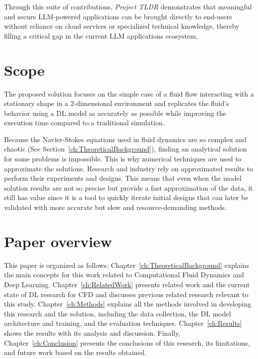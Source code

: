 Through this suite of contributions, \textit{Project TLDR} demonstrates that meaningful and secure LLM-powered applications can be brought directly to end-users without reliance on cloud services or specialized technical knowledge, thereby filling a critical gap in the current LLM applications ecosystem.


\section{Scope}
\label{sec:Scope}
The proposed solution focuses on the simple case of a fluid flow interacting with a stationary shape in a 2-dimensional environment and replicates the fluid's behavior using a DL model as accurately as possible while improving the execution time compared to a traditional simulation. 

Because the Navier-Stokes equations used in fluid dynamics are so complex and chaotic (See Section~\ref{ch:TheoreticalBackground}), finding an analytical solution for some problems is impossible. This is why numerical techniques are used to approximate the solutions. Research and industry rely on approximated results to perform their experiments and designs. This means that even when the model solution results are not so precise but provide a fast approximation of the data, it still has value since it is a tool to quickly iterate initial designs that can later be validated with more accurate but slow and resource-demanding methods.

\section{Paper overview}
\label{sec:PaperOverview}
This paper is organized as follows: Chapter~\ref{ch:TheoreticalBackground} explains the main concepts for this work related to Computational Fluid Dynamics and Deep Learning. Chapter~\ref{ch:RelatedWork} presents related work and the current state of DL research for CFD and discusses previous related research relevant to this study. Chapter~\ref{ch:Methods} explains all the methods involved in developing this research and the solution, including the data collection, the DL model architecture and training, and the evaluation techniques. Chapter~\ref{ch:Results} shows the results with its analysis and discussion. Finally, Chapter~\ref{ch:Conclusion} presents the conclusions of this research, its limitations, and future work based on the results obtained.


